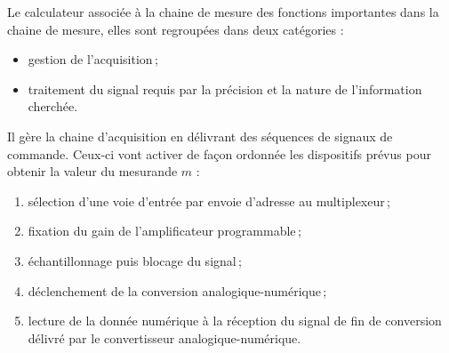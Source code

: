 \begin{figure}{\label{fig:exemple_chaine_mesure}}
\end{figure}

Le calculateur associée à la chaine de mesure des fonctions importantes dans la chaine de mesure, elles sont regroupées dans deux catégories :
\begin{itemize}
\item gestion de l'acquisition\,;
\item traitement du signal requis par la précision et la nature de l'information cherchée.
\end{itemize}

Il gère la chaine d'acquisition en délivrant des séquences de signaux de commande. Ceux-ci vont activer de façon ordonnée les dispositifs prévus pour obtenir la valeur du mesurande $m$ :
\begin{enumerate}
\item sélection d'une voie d'entrée par envoie d'adresse au multiplexeur\,;
\item fixation du gain de l'amplificateur programmable\,;
\item échantillonnage puis blocage du signal\,;
\item déclenchement de la conversion analogique-numérique\,;
\item lecture de la donnée numérique à la réception du signal de fin de conversion délivré par le convertisseur analogique-numérique.
\end{enumerate}

